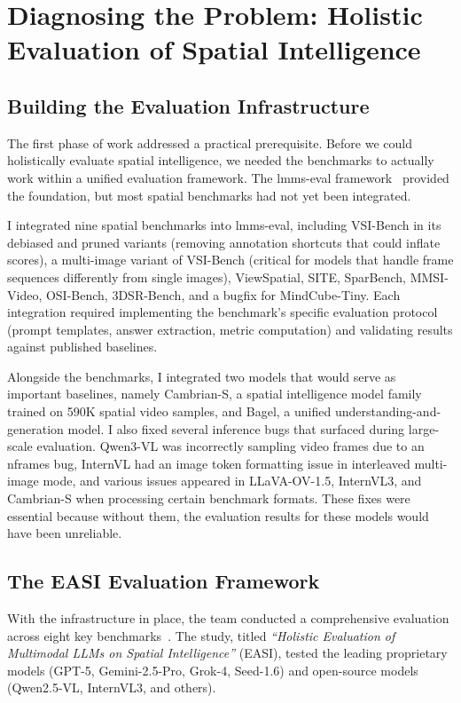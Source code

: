 \chapter{Diagnosing the Problem: Holistic Evaluation of Spatial Intelligence}
\label{sec:diagnosis}

\section{Building the Evaluation Infrastructure}

The first phase of work addressed a practical prerequisite. Before we could holistically evaluate spatial intelligence, we needed the benchmarks to actually work within a unified evaluation framework. The lmms-eval framework~\cite{Zhang_2025} provided the foundation, but most spatial benchmarks had not yet been integrated.

I integrated nine spatial benchmarks into lmms-eval, including VSI-Bench in its debiased and pruned variants (removing annotation shortcuts that could inflate scores), a multi-image variant of VSI-Bench (critical for models that handle frame sequences differently from single images), ViewSpatial, SITE, SparBench, MMSI-Video, OSI-Bench, 3DSR-Bench, and a bugfix for MindCube-Tiny. Each integration required implementing the benchmark's specific evaluation protocol (prompt templates, answer extraction, metric computation) and validating results against published baselines.

Alongside the benchmarks, I integrated two models that would serve as important baselines, namely Cambrian-S, a spatial intelligence model family trained on 590K spatial video samples, and Bagel, a unified understanding-and-generation model. I also fixed several inference bugs that surfaced during large-scale evaluation. Qwen3-VL was incorrectly sampling video frames due to an nframes bug, InternVL had an image token formatting issue in interleaved multi-image mode, and various issues appeared in LLaVA-OV-1.5, InternVL3, and Cambrian-S when processing certain benchmark formats. These fixes were essential because without them, the evaluation results for these models would have been unreliable.

\section{The EASI Evaluation Framework}

With the infrastructure in place, the team conducted a comprehensive evaluation across eight key benchmarks~\cite{cai2025holisticevaluationmultimodalllms}. The study, titled \textit{``Holistic Evaluation of Multimodal LLMs on Spatial Intelligence''} (EASI), tested the leading proprietary models (GPT-5, Gemini-2.5-Pro, Grok-4, Seed-1.6) and open-source models (Qwen2.5-VL, InternVL3, and others).

